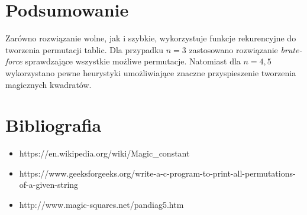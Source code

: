 \documentclass[a4paper, 12pt]{article}
\begin{document}
\section*{Podsumowanie}
Zarówno rozwiązanie wolne, jak i szybkie, wykorzystuje funkcje rekurencyjne do tworzenia permutacji tablic. Dla przypadku $n=3$ zastosowano rozwiązanie \textit{brute-force} sprawdzające wszystkie możliwe permutacje. Natomiast dla $n=4,5$ wykorzystano pewne heurystyki umożliwiające znaczne przyspieszenie tworzenia magicznych kwadratów.

\section*{Bibliografia}
\begin{itemize}
	\item https://en.wikipedia.org/wiki/Magic\_constant
	\item https://www.geeksforgeeks.org/write-a-c-program-to-print-all-permutations-of-a-given-string
	\item http://www.magic-squares.net/pandiag5.htm
\end{itemize}
\end{document}
